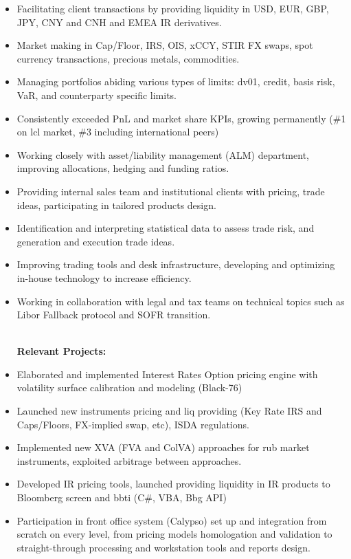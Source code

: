 \documentclass[letterpaper,hidelinks]{article}
\newcommand{\resumeItemRoutine}[1]{
  \item[\small\ding{223}]\small{
    {#1 \vspace{-2pt}}
  }
}
\newcommand{\resumeItemProject}[1]{
  \item[\small\ding{51}]\small{
    {#1 \vspace{-2pt}}
  }
}
\newcommand{\resumeItemListStart}{\begin{itemize}}
\newcommand{\resumeItemListEnd}{\end{itemize}\vspace{-5pt}}
\begin{document}
\vspace{1pt}
\resumeItemListStart
\resumeItemRoutine{Facilitating client transactions by providing liquidity in USD, EUR, GBP, JPY, CNY and CNH and EMEA IR derivatives.}
\resumeItemRoutine{Market making in Cap/Floor, IRS, OIS, xCCY, STIR FX swaps, spot currency transactions, precious metals, commodities.}
\resumeItemRoutine{Managing portfolios abiding various types of limits: dv01, credit, basis risk, VaR, and counterparty specific limits.}
\resumeItemRoutine{Consistently exceeded PnL and market share KPIs, growing permanently (\#1 on lcl market, \#3 including international peers)}
\resumeItemRoutine{Working closely with asset/liability management (ALM) department, improving allocations, hedging and funding ratios.}
\resumeItemRoutine{Providing internal sales team and institutional clients with pricing, trade ideas, participating in tailored products design.}
\resumeItemRoutine{Identification and interpreting statistical data to assess trade risk, and generation and execution trade ideas.}
\resumeItemRoutine{Improving trading tools and desk infrastructure, developing and optimizing in-house technology to increase efficiency.}
\resumeItemRoutine{Working in collaboration with legal and tax teams on technical topics such as Libor Fallback protocol and SOFR transition.}
\vspace{2pt}\\
\hspace{-13pt}\textbf{Relevant Projects:}
\vspace{-3pt}
\resumeItemProject{Elaborated and implemented Interest Rates Option pricing engine with volatility surface calibration and modeling (Black-76)}
\resumeItemProject{Launched new instruments pricing and liq providing (Key Rate IRS and Caps/Floors, FX-implied swap, etc), ISDA regulations.}
\resumeItemProject{Implemented new XVA (FVA and ColVA) approaches for rub market instruments, exploited arbitrage between approaches.}
\resumeItemProject{Developed IR pricing tools, launched providing liquidity in IR products to Bloomberg screen and bbti (C\#, VBA, Bbg API)}
\resumeItemProject{Participation in front office system (Calypso) set up and integration from scratch on every level, from pricing models homologation and validation to straight-through processing and workstation tools and reports design.}
\resumeItemListEnd
\end{document}
